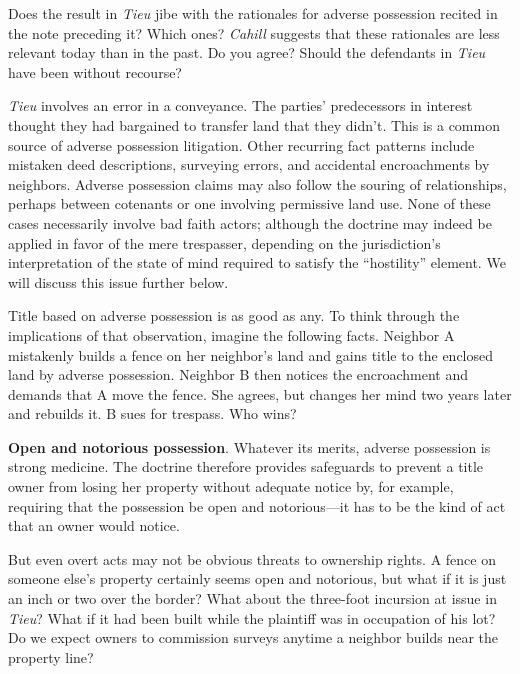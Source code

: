 
\item Does the result in \textit{Tieu} jibe with the rationales for adverse
possession recited in the note preceding it? Which ones?
\textit{Cahill} suggests that these rationales are less relevant today than in
the past. Do you agree? Should the defendants in \textit{Tieu} have been
without recourse?

\item \textit{Tieu} involves an error in a conveyance. The parties' predecessors
in interest thought they had bargained to transfer land that they didn't. This
is a common source of adverse possession litigation. Other recurring fact
patterns include mistaken deed descriptions, surveying errors, and accidental
encroachments by neighbors. Adverse possession claims may also follow the
souring of relationships, perhaps between cotenants or one involving permissive
land use. None of these cases necessarily involve bad faith actors; although
the doctrine may indeed be applied in favor of the mere trespasser, depending
on the jurisdiction's interpretation of the state of mind required to satisfy
the ``hostility'' element. We will discuss this issue further below.

\item Title based on adverse possession is as good as any. To think through the
implications of that observation, imagine the following facts. Neighbor A
mistakenly builds a fence on her neighbor's land and gains title to the
enclosed land by adverse possession. Neighbor B then notices the encroachment
and demands that A move the fence. She agrees, but changes her mind two years
later and rebuilds it. B sues for trespass. Who wins?

\item \textbf{Open and notorious possession}.
\label{n:mannillo-v-gorski}
Whatever its merits, adverse
possession is strong medicine. The doctrine therefore provides safeguards to
prevent a title owner from losing her property without adequate notice by, for
example, requiring that the possession be open and notorious---it has to be the
kind of act that an owner would notice. 

But even overt acts may not be obvious threats to ownership rights. A fence on
someone else's property certainly seems open and notorious, but what if it is
just an inch or two over the border? What about the three-foot incursion at
issue in \textit{Tieu}? What if it had been built while the plaintiff was in
occupation of his lot? Do we expect owners to commission surveys anytime a
neighbor builds near the property line?


